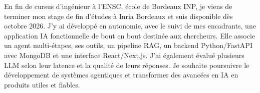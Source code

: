 
\begin{cvparagraph}
En fin de cursus d’ingénieur à l’ENSC, école de Bordeaux INP, je viens de terminer mon stage de fin d’études à Inria Bordeaux et suis disponible dès octobre 2026. J’y ai développé en autonomie, avec le suivi de mes encadrants, une application IA fonctionnelle de bout en bout destinée aux chercheurs. Elle associe un agent multi-étapes, ses outils, un pipeline RAG, un backend Python/FastAPI avec MongoDB et une interface React/Next.js. J’ai également évalué plusieurs LLM selon leur latence et la qualité de leurs réponses. Je souhaite poursuivre le développement de systèmes agentiques et transformer des avancées en IA en produits utiles et fiables.
\end{cvparagraph}
